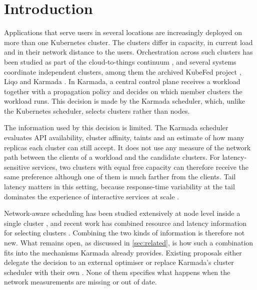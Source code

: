 \section{Introduction}\label{sec:introduction}

Applications that serve users in several locations are increasingly deployed on more than one Kubernetes cluster. The clusters differ in capacity, in current load and in their network distance to the users. Orchestration across such clusters has been studied as part of the cloud-to-things continuum \cite{ullah2023orchestration}, and several systems coordinate independent clusters, among them the archived KubeFed project \cite{kubefed_repo}, Liqo \cite{iorio2023liquid} and Karmada \cite{karmada_repo,karmada_docs_architecture}. In Karmada, a central control plane receives a workload together with a propagation policy and decides on which member clusters the workload runs. This decision is made by the Karmada scheduler, which, unlike the Kubernetes scheduler, selects clusters rather than nodes.

The information used by this decision is limited. The Karmada scheduler evaluates API availability, cluster affinity, taints and an estimate of how many replicas each cluster can still accept. It does not use any measure of the network path between the clients of a workload and the candidate clusters. For latency-sensitive services, two clusters with equal free capacity can therefore receive the same preference although one of them is much farther from the clients. Tail latency matters in this setting, because response-time variability at the tail dominates the experience of interactive services at scale \cite{dean2013tail}.

Network-aware scheduling has been studied extensively at node level inside a single cluster \cite{santos2019networkaware,santos2023diktyo,wojciechowski2021netmarks,centofanti2023latency,ragavan2025nas}, and recent work has combined resource and latency information for selecting clusters \cite{tabatabaei2025cnf,bregar2026cosmospan,chiaro2024lais}. Combining the two kinds of information is therefore not new. What remains open, as discussed in \cref{sec:related}, is how such a combination fits into the mechanisms Karmada already provides. Existing proposals either delegate the decision to an external optimiser \cite{tabatabaei2025cnf} or replace Karmada's cluster scheduler with their own \cite{bregar2026cosmospan}. None of them specifies what happens when the network measurements are missing or out of date.

